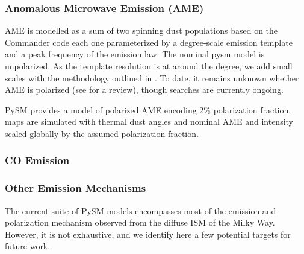 \documentclass[twocolumn]{aastex631}
\begin{document}
\subsubsection{Anomalous Microwave Emission (AME)}
AME is modelled as  a sum of two spinning dust populations based on the Commander code \citep{planck2014-a11} each one parameterized by a degree-scale emission template and a peak frequency of the emission law.  The nominal pysm  model is unpolarized. As the template resolution is at around the degree, we add small scales with the methodology outlined in \citet{Thorne:2017}.
To date, it remains unknown whether AME is polarized (see \citet{Dickinson:2018} for a review), though searches are currently ongoing. 

PySM provides a model of polarized AME encoding  2\% polarization fraction,  maps are  simulated with thermal dust angles and nominal AME and intensity scaled globally by the assumed  polarization fraction.


\subsubsection{CO Emission}


\subsubsection{Other Emission Mechanisms} %
The current suite of PySM models encompasses most of the emission and polarization mechanism observed from the diffuse ISM of the Milky Way. However, it is not exhaustive, and we identify here a few potential targets for future work. 
\end{document}
